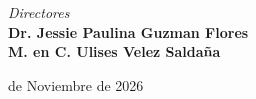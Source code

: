 \begin{titlepage}
	
	{\fontsize{14}{16.8}\selectfont \textit{Directores}}\\[0.4cm]
	{\fontsize{14}{16.8}\selectfont \textbf{Dr. Jessie Paulina Guzman Flores}}\\[.3cm]
	{\fontsize{14}{16.8}\selectfont \textbf{M. en C. Ulises Velez Saldaña}}\\[.3cm]
	\vfill
	
	{\fontsize{12}{14.4} de Noviembre de 2026}
	
\end{titlepage}

\restoregeometry






	
	\cleardoublepage
